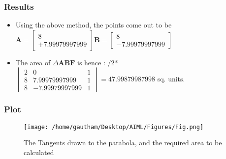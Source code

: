 \documentclass{beamer}
\begin{document}
\begin{frame}
\frametitle{Results}
\begin{itemize}
	\item<1->Using the above method, the points come out to be \newline \newline$\mathbf{A} = \begin{bmatrix} 8 \\ +7.99979997999
	\end{bmatrix} $\newline $\mathbf{B} = \begin{bmatrix} 8 \\ -7.99979997999
	\end{bmatrix}$\newline \newline
	\item<2->The area of $\Delta\mathbf{ABF}$ is hence : \newline {}/2*$\begin{vmatrix}2 & 0 & 1 \\ 8 & 7.99979997999 & 1 \\ 8 & -7.99979997999 & 1
	\end{vmatrix} = 47.99879987998$ sq. units.
\end{itemize}
\end{frame}

\begin{frame}
	\frametitle{Plot}
	\begin{figure}[h]
	\centering
	\texttt{[image: /home/gautham/Desktop/AIML/Figures/Fig.png]}
	\caption{The Tangents drawn to the parabola, and the required area to be calculated}
	\label{foobar-figure}
	\end{figure}

\end{frame}
\end{document}
